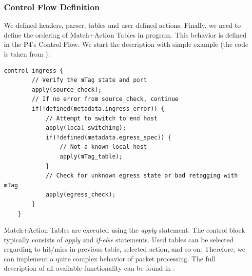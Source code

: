 \subsubsection*{Control Flow Definition}
We defined headers, parser, tables and user defined actions. Finally, we need to define the ordering of Match+Action Tables in program.
This behavior is defined in the P4's Control Flow. We start the description with simple example (the code is taken from \cite{p4languagespec}):
\begin{Verbatim}[fontsize=\small]
    control ingress {
        // Verify the mTag state and port 
        apply(source_check);
        // If no error from source_check, continue
        if(!defined(metadata.ingress_error)) {
            // Attempt to switch to end host
            apply(local_switching);
            if(!defined(metadata.egress_spec)) {
                // Not a known local host
                apply(mTag_table);
            }
            // Check for unknown egress state or bad retagging with mTag
            apply(egress_check);
        }
    }
\end{Verbatim}

Match+Action Tables are executed using the \textit{apply} statement. The control block typically consists of \textit{apply} and \textit{if-else} 
statements. Used tables can be selected regarding to hit/miss in previous table, selected action, and so on.
Therefore, we can implement a quite complex behavior of packet processing. 
The full description of all available functionality can be found in \cite{p4languagespec}.

